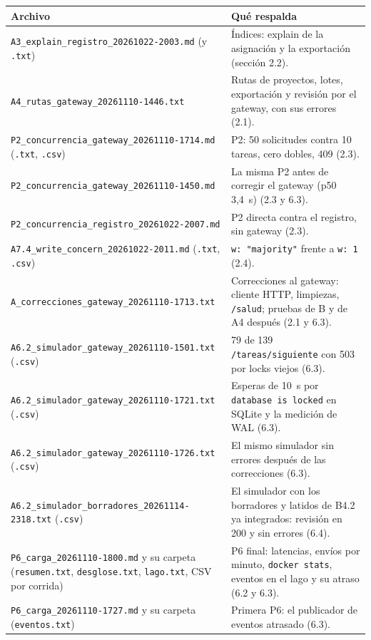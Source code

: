 \documentclass[10pt,letterpaper]{article}
\begin{document}
{\small
\begin{longtable}{@{}p{}p{}@{}}
\toprule
Archivo & Qué respalda \\
\midrule
\endhead
\texttt{A3\_explain\_registro\_20261022-2003.md} (y \texttt{.txt}) & Índices: explain de la asignación y la exportación (sección 2.2). \\
\texttt{A4\_rutas\_gateway\_20261110-1446.txt} & Rutas de proyectos, lotes, exportación y revisión por el gateway, con sus errores (2.1). \\
\texttt{P2\_concurrencia\_gateway\_20261110-1714.md} (\texttt{.txt}, \texttt{.csv}) & P2: 50 solicitudes contra 10 tareas, cero dobles, 409 (2.3). \\
\texttt{P2\_concurrencia\_gateway\_20261110-1450.md} & La misma P2 antes de corregir el gateway (p50 3,4~s) (2.3 y 6.3). \\
\texttt{P2\_concurrencia\_registro\_20261022-2007.md} & P2 directa contra el registro, sin gateway (2.3). \\
\texttt{A7.4\_write\_concern\_20261022-2011.md} (\texttt{.txt}, \texttt{.csv}) & \texttt{w: "majority"} frente a \texttt{w: 1} (2.4). \\
\texttt{A\_correcciones\_gateway\_20261110-1713.txt} & Correcciones al gateway: cliente HTTP, limpiezas, \texttt{/salud}; pruebas de B y de A4 después (2.1 y 6.3). \\
\texttt{A6.2\_simulador\_gateway\_20261110-1501.txt} (\texttt{.csv}) & 79 de 139 \texttt{/tareas/siguiente} con 503 por locks viejos (6.3). \\
\texttt{A6.2\_simulador\_gateway\_20261110-1721.txt} (\texttt{.csv}) & Esperas de 10~s por \texttt{database is locked} en SQLite y la medición de WAL (6.3). \\
\texttt{A6.2\_simulador\_gateway\_20261110-1726.txt} (\texttt{.csv}) & El mismo simulador sin errores después de las correcciones (6.3). \\
\texttt{A6.2\_simulador\_borradores\_20261114-2318.txt} (\texttt{.csv}) & El simulador con los borradores y latidos de B4.2 ya integrados: revisión en 200 y sin errores (6.4). \\
\texttt{P6\_carga\_20261110-1800.md} y su carpeta (\texttt{resumen.txt}, \texttt{desglose.txt}, \texttt{lago.txt}, CSV por corrida) & P6 final: latencias, envíos por minuto, \texttt{docker stats}, eventos en el lago y su atraso (6.2 y 6.3). \\
\texttt{P6\_carga\_20261110-1727.md} y su carpeta (\texttt{eventos.txt}) & Primera P6: el publicador de eventos atrasado (6.3). \\

\end{longtable}}
\end{document}
